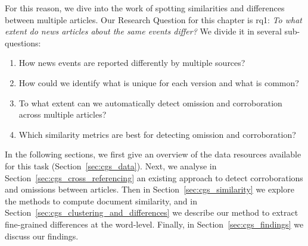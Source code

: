 For this reason, we dive into the work of spotting similarities and differences between multiple articles.
Our Research Question for this chapter is \acrshort{rq}1: \emph{To what extent do news articles about the same events differ?}
We divide it in several sub-questions: 
\begin{enumerate}[label={\textbf{RQ1.\arabic*:}},leftmargin=2cm]
    \item How news events are reported differently by multiple sources?
    \item How could we identify what is unique for each version and what is common? 
    \item To what extent can we automatically detect omission and corroboration across multiple articles?
    \item Which similarity metrics are best for detecting omission and corroboration?
\end{enumerate}




In the following sections, we first give an overview of the data resources available for this task (Section~\ref{sec:cgs_data}). Next, we
analyse in Section~\ref{sec:cgs_cross_referencing} an existing approach to detect corroborations and omissions between articles. Then in Section~\ref{sec:cgs_similarity} we explore the methods to compute document similarity, and in Section~\ref{sec:cgs_clustering_and_differences} we describe our method to extract fine-grained differences at the word-level. Finally, in Section~\ref{sec:cgs_findings} we discuss our findings.



